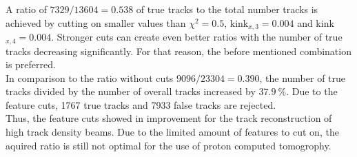 A ratio of $7329/13604 = 0.538$ of true tracks to the total number tracks is achieved by cutting on smaller values than $\chi^2 = 0.5$,  kink$_{x,3} = 0.004$ and kink$_{x,4}=0.004$.
Stronger cuts can create even better ratios with the number of true tracks decreasing significantly. For that reason, the before mentioned combination is preferred. \\
In comparison to the ratio without cuts $9096/23304 = 0.390$, the number of true tracks divided by the number of overall tracks increased by $\SI{37.9}{\percent}$. Due to
the feature cuts, 1767 true tracks and 7933 false tracks are rejected. \\
Thus, the feature cuts showed in improvement for the track reconstruction of high track density beams. Due to the limited amount of features to cut on, the aquired ratio
is still not optimal for the use of proton computed tomogrophy.

